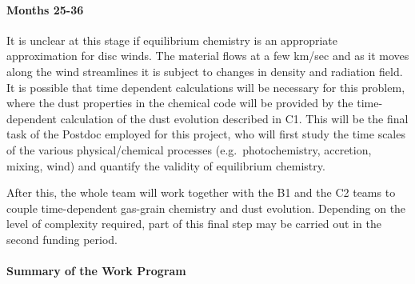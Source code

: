 \documentclass[10pt,fleqn,twoside]{article}
\begin{document}
\paragraph{ Months 25-36}

 It is unclear at this stage
if equilibrium chemistry is an appropriate approximation for disc
winds. The material flows at a few km/sec and as it moves along the
wind streamlines it is subject to changes in density and radiation
field. It is possible that time  dependent calculations will be necessary for this problem, where the dust properties in the chemical code will be provided by the time-dependent calculation of the dust evolution described in C1. This will be the final task of the Postdoc employed for this project, who will first study the time scales of the various physical/chemical processes (e.g.\ photochemistry, accretion, mixing, wind) and quantify the validity of equilibrium chemistry.

After this, the whole team will work together with the B1 and the C2 teams to couple time-dependent gas-grain chemistry and dust evolution.  Depending on the level of complexity required, part of this final step may be carried out in the second funding period.

\paragraph{Summary of the Work Program}
\end{document}
